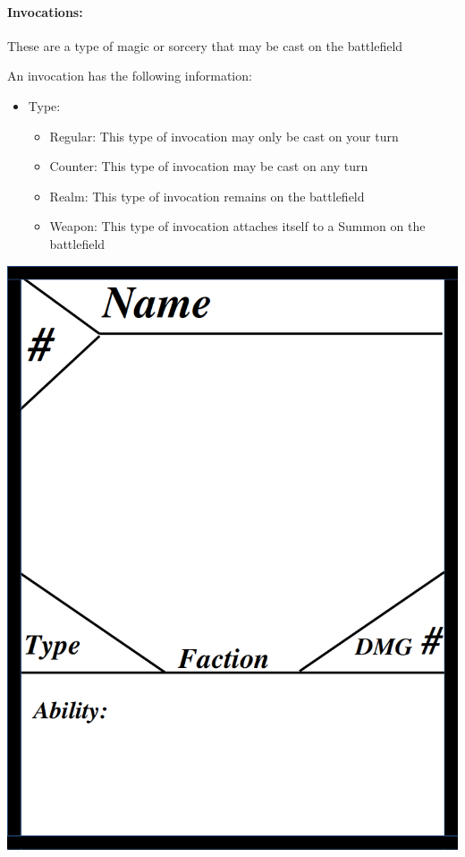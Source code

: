 \documentclass[12pt, letterpaper]{article}
\begin{document}
\paragraph{Invocations: \\}
\par These are a type of magic or sorcery that may be cast on the battlefield 
\par An invocation has the following information: 
\begin{itemize}
    \item Type: 
    \begin{itemize}
        \item Regular: This type of invocation may only be cast on your turn 
        \item Counter: This type of invocation may be cast on any turn
        \item Realm: This type of invocation remains on the battlefield
        \item Weapon: This type of invocation attaches itself to a Summon on the battlefield
    \end{itemize}
\end{itemize}

\begin{center}
    \includegraphics[scale = 0.4]{images/CardTemplate.png}
\end{center}
\end{document}
